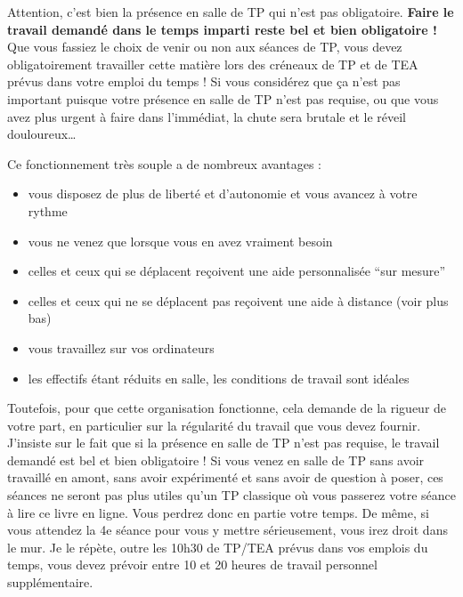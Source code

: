 \documentclass[
  a4paper,
  DIV=11,
  numbers=noendperiod,
  oneside]{scrreprt}
\providecommand{\tightlist}{%
  \setlength{\itemsep}{0pt}\setlength{\parskip}{0pt}}\usepackage{longtable,booktabs,array}
\begin{document}
\begin{tcolorbox}[enhanced jigsaw, colbacktitle=quarto-callout-important-color!10!white, left=2mm, leftrule=.75mm, titlerule=0mm, bottomtitle=1mm, colback=white, breakable, arc=.35mm, bottomrule=.15mm, toprule=.15mm, toptitle=1mm, opacitybacktitle=0.6, title=\textcolor{quarto-callout-important-color}{\faExclamation}\hspace{0.5em}{Important}, coltitle=black, rightrule=.15mm, opacityback=0, colframe=quarto-callout-important-color-frame]

Attention, c'est bien la présence en salle de TP qui n'est pas
obligatoire. \textbf{Faire le travail demandé dans le temps imparti
reste bel et bien obligatoire !} Que vous fassiez le choix de venir ou
non aux séances de TP, vous devez obligatoirement travailler cette
matière lors des créneaux de TP et de TEA prévus dans votre emploi du
temps ! Si vous considérez que ça n'est pas important puisque votre
présence en salle de TP n'est pas requise, ou que vous avez plus urgent
à faire dans l'immédiat, la chute sera brutale et le réveil
douloureux\ldots{}

\end{tcolorbox}

Ce fonctionnement très souple a de nombreux avantages :

\begin{itemize}
\tightlist
\item
  vous disposez de plus de liberté et d'autonomie et vous avancez à
  votre rythme
\item
  vous ne venez que lorsque vous en avez vraiment besoin
\item
  celles et ceux qui se déplacent reçoivent une aide personnalisée ``sur
  mesure''
\item
  celles et ceux qui ne se déplacent pas reçoivent une aide à distance
  (voir plus bas)
\item
  vous travaillez sur vos ordinateurs
\item
  les effectifs étant réduits en salle, les conditions de travail sont
  idéales
\end{itemize}

Toutefois, pour que cette organisation fonctionne, cela demande de la
rigueur de votre part, en particulier sur la régularité du travail que
vous devez fournir. J'insiste sur le fait que si la présence en salle de
TP n'est pas requise, le travail demandé est bel et bien obligatoire !
Si vous venez en salle de TP sans avoir travaillé en amont, sans avoir
expérimenté et sans avoir de question à poser, ces séances ne seront pas
plus utiles qu'un TP classique où vous passerez votre séance à lire ce
livre en ligne. Vous perdrez donc en partie votre temps. De même, si
vous attendez la 4e séance pour vous y mettre sérieusement, vous irez
droit dans le mur. Je le répète, outre les 10h30 de TP/TEA prévus dans
vos emplois du temps, vous devez prévoir entre 10 et 20 heures de
travail personnel supplémentaire.
\end{document}
